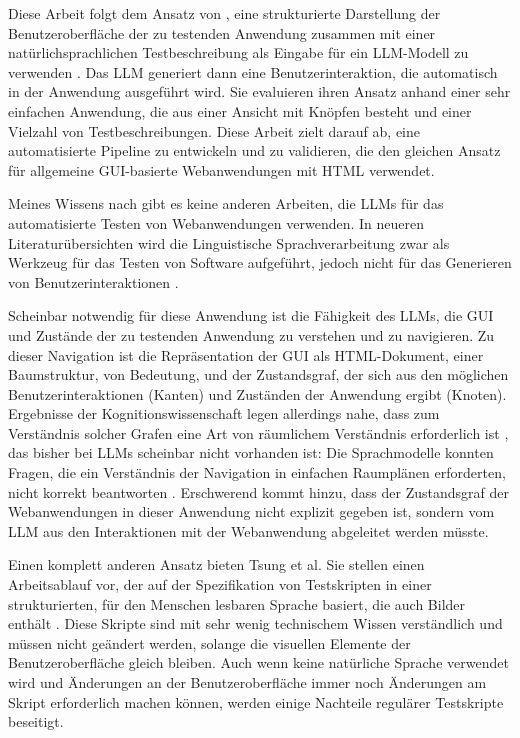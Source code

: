 Diese Arbeit folgt dem Ansatz von , eine strukturierte Darstellung der Benutzeroberfläche der zu testenden Anwendung zusammen mit einer natürlichsprachlichen Testbeschreibung als Eingabe für ein LLM-Modell zu verwenden \cite{GPT3Testing}.
Das LLM generiert dann eine Benutzerinteraktion, die automatisch in der Anwendung ausgeführt wird.
Sie evaluieren ihren Ansatz anhand einer sehr einfachen Anwendung, die aus einer Ansicht mit Knöpfen besteht und einer Vielzahl von Testbeschreibungen.
Diese Arbeit zielt darauf ab, eine automatisierte Pipeline zu entwickeln und zu validieren, die den gleichen Ansatz für allgemeine GUI-basierte Webanwendungen mit HTML verwendet.

Meines Wissens nach gibt es keine anderen Arbeiten, die LLMs für das automatisierte Testen von Webanwendungen verwenden.
In neueren Literaturübersichten wird die Linguistische Sprachverarbeitung zwar als Werkzeug für das Testen von Software aufgeführt, jedoch nicht für das Generieren von Benutzerinteraktionen \cite{implementation_verma_2023, machine_fontes_2021}.

Scheinbar notwendig für diese Anwendung ist die Fähigkeit des LLMs, die GUI und Zustände der zu testenden Anwendung zu verstehen und zu navigieren.
Zu dieser Navigation ist die Repräsentation der GUI als HTML-Dokument, einer Baumstruktur, von Bedeutung, und der Zustandsgraf, der sich aus den möglichen Benutzerinteraktionen (Kanten) und Zuständen der Anwendung ergibt (Knoten).
Ergebnisse der Kognitionswissenschaft legen allerdings nahe, dass zum Verständnis solcher Grafen eine Art von räumlichem Verständnis erforderlich ist \cite{what_is_a_cognitive_map}, das bisher bei LLMs scheinbar nicht vorhanden ist:
Die Sprachmodelle konnten Fragen, die ein Verständnis der Navigation in einfachen Raumplänen erforderten, nicht korrekt beantworten \cite{cogmaps_llm}.
Erschwerend kommt hinzu, dass der Zustandsgraf der Webanwendungen in dieser Anwendung nicht explizit gegeben ist, sondern vom LLM aus den Interaktionen mit der Webanwendung abgeleitet werden müsste.

Einen komplett anderen Ansatz bieten Tsung et al.
Sie stellen einen Arbeitsablauf vor, der auf der Spezifikation von Testskripten in einer strukturierten, für den Menschen lesbaren Sprache basiert, die auch Bilder enthält \cite{tsung}.
Diese Skripte sind mit sehr wenig technischem Wissen verständlich und müssen nicht geändert werden, solange die visuellen Elemente der Benutzeroberfläche gleich bleiben.
Auch wenn keine natürliche Sprache verwendet wird und Änderungen an der Benutzeroberfläche immer noch Änderungen am Skript erforderlich machen können, werden einige Nachteile regulärer Testskripte beseitigt.


